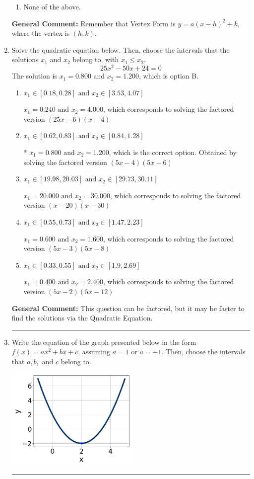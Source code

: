 \documentclass{extbook}[14pt]
\newcommand{\litem}[1]{\item #1

\rule{\textwidth}{0.4pt}}
\begin{document}
\begin{enumerate}
{\begin{enumerate}[label=\Alph*.]
\begin{multicols}{2}
\end{multicols}\item None of the above.\end{enumerate}
\textbf{General Comment:} Remember that Vertex Form is $y = a(x-h)^2+k$, where the vertex is $(h, k)$.
}
\litem{
Solve the quadratic equation below. Then, choose the intervals that the solutions $x_1$ and $x_2$ belong to, with $x_1 \leq x_2$.
\[ 25x^{2} -50 x + 24 = 0 \]The solution is \( x_1 = 0.800 \text{ and } x_2 = 1.200 \), which is option B.\begin{enumerate}[label=\Alph*.]
\item \( x_1 \in [0.18, 0.28] \text{ and } x_2 \in [3.53, 4.07] \)

$x_1 = 0.240 \text{ and } x_2 = 4.000$, which corresponds to solving the factored version $(25x -6)(x -4)$
\item \( x_1 \in [0.62, 0.83] \text{ and } x_2 \in [0.84, 1.28] \)

* $x_1 = 0.800 \text{ and } x_2 = 1.200$, which is the correct option. Obtained by solving the factored version $(5x -4)(5x -6)$
\item \( x_1 \in [19.98, 20.03] \text{ and } x_2 \in [29.73, 30.11] \)

$x_1 = 20.000 \text{ and } x_2 = 30.000$, which corresponds to solving the factored version $(x -20)(x -30)$
\item \( x_1 \in [0.55, 0.73] \text{ and } x_2 \in [1.47, 2.23] \)

$x_1 = 0.600 \text{ and } x_2 = 1.600$, which corresponds to solving the factored version $(5x -3)(5x -8)$
\item \( x_1 \in [0.33, 0.55] \text{ and } x_2 \in [1.9, 2.69] \)

$x_1 = 0.400 \text{ and } x_2 = 2.400$, which corresponds to solving the factored version $(5x -2)(5x -12)$
\end{enumerate}

\textbf{General Comment:} This question can be factored, but it may be faster to find the solutions via the Quadratic Equation.
}
\litem{
Write the equation of the graph presented below in the form $f(x)=ax^2+bx+c$, assuming  $a=1$ or $a=-1$. Then, choose the intervals that $a, b,$ and $c$ belong to.

\begin{center}
    \includegraphics[width=0.5\textwidth]{../Figures/quadraticGraphToEquationC.png}
\end{center}


}
\end{enumerate}
\end{document}
